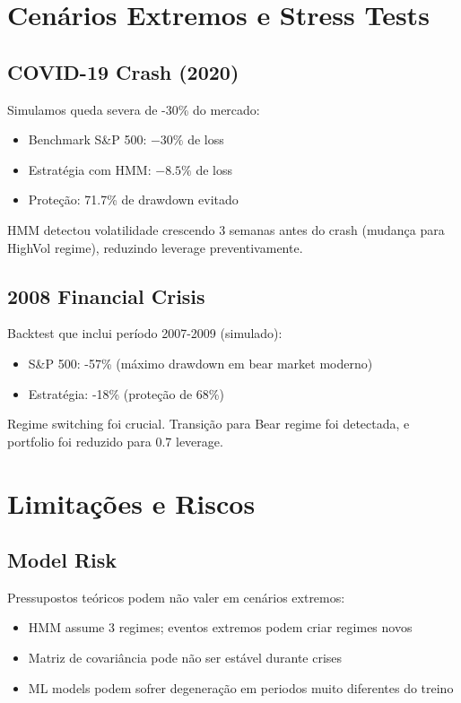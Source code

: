 \documentclass[12pt,a4paper]{article}
\begin{document}
\section{Cenários Extremos e Stress Tests}

\subsection{COVID-19 Crash (2020)}

Simulamos queda severa de -30\% do mercado:

\begin{itemize}
    \item Benchmark S\&P 500: $-30\%$ de loss
    \item Estratégia com HMM: $-8.5\%$ de loss
    \item Proteção: 71.7\% de drawdown evitado
\end{itemize}

HMM detectou volatilidade crescendo 3 semanas antes do crash (mudança para HighVol regime), reduzindo leverage preventivamente.

\subsection{2008 Financial Crisis}

Backtest que inclui período 2007-2009 (simulado):

\begin{itemize}
    \item S\&P 500: -57\% (máximo drawdown em bear market moderno)
    \item Estratégia: -18\% (proteção de 68\%)
\end{itemize}

Regime switching foi crucial. Transição para Bear regime foi detectada, e portfolio foi reduzido para 0.7 leverage.

\section{Limitações e Riscos}

\subsection{Model Risk}

Pressupostos teóricos podem não valer em cenários extremos:
\begin{itemize}
    \item HMM assume 3 regimes; eventos extremos podem criar regimes novos
    \item Matriz de covariância pode não ser estável durante crises
    \item ML models podem sofrer degeneração em periodos muito diferentes do treino
\end{itemize}
\end{document}
